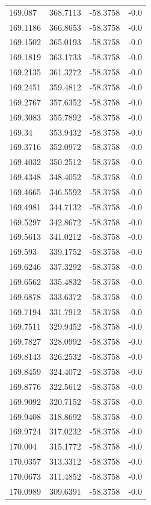 \begin{table}[H]
\begin{tabular}{llll}
169.087 & 368.7113 & -58.3758 & -0.0 \\
169.1186 & 366.8653 & -58.3758 & -0.0 \\
169.1502 & 365.0193 & -58.3758 & -0.0 \\
169.1819 & 363.1733 & -58.3758 & -0.0 \\
169.2135 & 361.3272 & -58.3758 & -0.0 \\
169.2451 & 359.4812 & -58.3758 & -0.0 \\
169.2767 & 357.6352 & -58.3758 & -0.0 \\
169.3083 & 355.7892 & -58.3758 & -0.0 \\
169.34 & 353.9432 & -58.3758 & -0.0 \\
169.3716 & 352.0972 & -58.3758 & -0.0 \\
169.4032 & 350.2512 & -58.3758 & -0.0 \\
169.4348 & 348.4052 & -58.3758 & -0.0 \\
169.4665 & 346.5592 & -58.3758 & -0.0 \\
169.4981 & 344.7132 & -58.3758 & -0.0 \\
169.5297 & 342.8672 & -58.3758 & -0.0 \\
169.5613 & 341.0212 & -58.3758 & -0.0 \\
169.593 & 339.1752 & -58.3758 & -0.0 \\
169.6246 & 337.3292 & -58.3758 & -0.0 \\
169.6562 & 335.4832 & -58.3758 & -0.0 \\
169.6878 & 333.6372 & -58.3758 & -0.0 \\
169.7194 & 331.7912 & -58.3758 & -0.0 \\
169.7511 & 329.9452 & -58.3758 & -0.0 \\
169.7827 & 328.0992 & -58.3758 & -0.0 \\
169.8143 & 326.2532 & -58.3758 & -0.0 \\
169.8459 & 324.4072 & -58.3758 & -0.0 \\
169.8776 & 322.5612 & -58.3758 & -0.0 \\
169.9092 & 320.7152 & -58.3758 & -0.0 \\
169.9408 & 318.8692 & -58.3758 & -0.0 \\
169.9724 & 317.0232 & -58.3758 & -0.0 \\
170.004 & 315.1772 & -58.3758 & -0.0 \\
170.0357 & 313.3312 & -58.3758 & -0.0 \\
170.0673 & 311.4852 & -58.3758 & -0.0 \\
170.0989 & 309.6391 & -58.3758 & -0.0 \\

\end{tabular}
\end{table}
